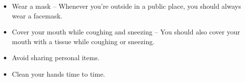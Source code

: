\documentclass[12pts]{article}
\begin{document}
\begin{itemize}
\item Wear a mask – Whenever you’re outside in a public place, you should always wear a facemask.
\item Cover your mouth while coughing and sneezing – You should     also cover your mouth with a tissue while coughing or sneezing.
\item Avoid sharing personal items.
\item Clean your hands time to time.
\end{itemize}
\end{document}
